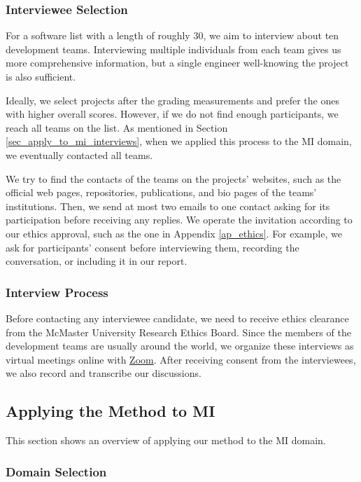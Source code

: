 \documentclass[preprint,12pt,authoryear]{elsarticle}
\begin{document}
\subsubsection{Interviewee Selection} \label{sec_interviewee_selection}

For a software list with a length of roughly 30, we aim to interview about ten
development teams. Interviewing multiple individuals from each team gives us
more comprehensive information, but a single engineer well-knowing the project
is also sufficient.

Ideally, we select projects after the grading measurements and prefer the ones
with higher overall scores. However, if we do not find enough participants, we
reach all teams on the list. As mentioned in Section
\ref{sec_apply_to_mi_interviews}, when we applied this process to the MI domain,
we eventually contacted all teams.

We try to find the contacts of the teams on the projects' websites, such as the
official web pages, repositories, publications, and bio pages of the teams'
institutions. Then, we send at most two emails to one contact asking for its
participation before receiving any replies. We operate the invitation according
to our ethics approval, such as the one in Appendix \ref{ap_ethics}. For
example, we ask for participants' consent before interviewing them, recording
the conversation, or including it in our report.

\subsubsection{Interview Process} \label{sec_interview_process}

Before contacting any interviewee candidate, we need to receive ethics clearance
from the McMaster University Research Ethics Board. Since the members of the
development teams are usually around the world, we organize these interviews as
virtual meetings online with \hyperlink{https://zoom.us/}{Zoom}. After receiving
consent from the interviewees, we also record and transcribe our discussions.

\subsection{Applying the Method to MI} \label{sec_applying_method}

This section shows an overview of applying our method to the MI domain.

\subsubsection{Domain Selection}
\end{document}

